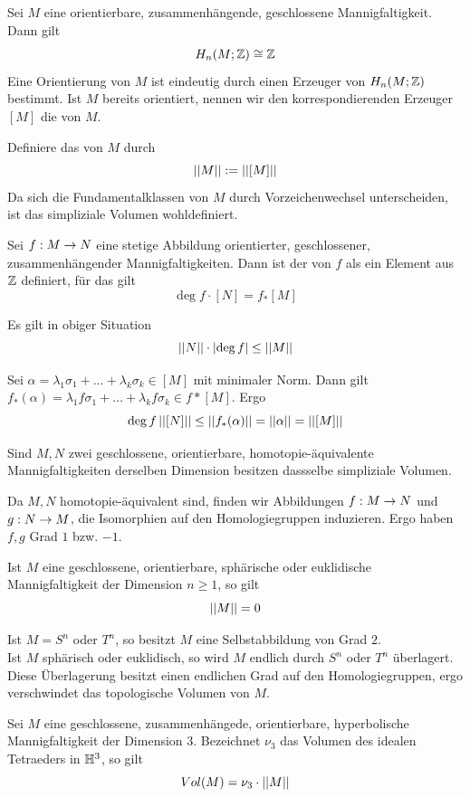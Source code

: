 \documentclass{book}
\begin{document}
\Bem{}
Sei $M$ eine orientierbare, zusammenhängende, geschlossene Mannigfaltigkeit. Dann gilt
\[ H_n(M; \mathbb{Z}) \overset{}{\cong} \mathbb{Z} \]
Eine Orientierung von $M$ ist eindeutig durch einen Erzeuger von $H_n(M; \mathbb{Z})$ bestimmt. Ist $M$ bereits orientiert, nennen wir den korrespondierenden Erzeuger $[M]$ die  von $M$.

\Def{}
Definiere das  von $M$ durch
\[ \left|\left|M\right|\right| := \left|\left|[M]\right|\right| \]
Da sich die Fundamentalklassen von $M$ durch Vorzeichenwechsel unterscheiden, ist das simpliziale Volumen wohldefiniert.

\Def{}
Sei $f : M \overset{}{\rightarrow} N$ eine stetige Abbildung orientierter, geschlossener, zusammenhängender Mannigfaltigkeiten. Dann ist der  von $f$ als ein Element aus $\mathbb{Z}$ definiert, für das gilt
\[ \deg f \cdot [N] = f_*[M] \]

\Prop{}
Es gilt in obiger Situation
\[ \left|\left|N\right|\right| \cdot \left|\deg f\right| \leq \left|\left|M\right|\right| \]
\begin{Beweis}{}
	Sei $\alpha = \lambda_1 \sigma_1 + \ldots + \lambda_k \sigma_k \in [M]$ mit minimaler Norm. Dann gilt $f_*(\alpha)= \lambda_1 f\sigma_1 + \ldots + \lambda_k f\sigma_k \in f*[M]$. Ergo
	\[ \deg f\left|\left|[N]\right|\right| \leq \left|\left|f_*(\alpha)\right|\right| = \left|\left|\alpha\right|\right| = \left|\left|[M]\right|\right| \]
\end{Beweis}

\Kor{}
Sind $M,N$ zwei geschlossene, orientierbare, homotopie-äquivalente Mannigfaltigkeiten derselben Dimension besitzen dassselbe simpliziale Volumen.
\begin{Beweis}{}
	Da $M,N$ homotopie-äquivalent sind, finden wir Abbildungen $f : M\overset{}{\rightarrow} N$ und $g : N \overset{}{\rightarrow} M$, die Isomorphien auf den Homologiegruppen induzieren. Ergo haben $f,g$ Grad $1$ bzw. $-1$.
\end{Beweis}

\Kor{}
Ist $M$ eine geschlossene, orientierbare, sphärische oder euklidische Mannigfaltigkeit der Dimension $n\geq 1$, so gilt
\[ \left|\left|M\right|\right| = 0 \]
\begin{Beweis}{}
	Ist $M = S^n$ oder $T^n$, so besitzt $M$ eine Selbstabbildung von Grad $2$.\\
	Ist $M$ sphärisch oder euklidisch, so wird $M$ endlich durch $S^n$ oder $T^n$ überlagert. Diese Überlagerung besitzt einen endlichen Grad auf den Homologiegruppen, ergo verschwindet das topologische Volumen von $M$.
\end{Beweis}

\Satz{}
Sei $M$ eine geschlossene, zusammenhängede, orientierbare, hyperbolische Mannigfaltigkeit der Dimension 3. Bezeichnet $\nu_3$ das Volumen des idealen Tetraeders in $\mathbb{H}^3$, so gilt
\[ Vol(M) = \nu_3 \cdot \left|\left|M\right|\right| \]
\end{document}
